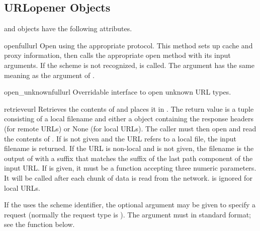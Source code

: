\subsection{URLopener Objects \label{urlopener-objs}}

 and  objects have the
following attributes.

\begin{methoddesc}[URLopener]{open}{fullurl}
Open  using the appropriate protocol.  This method sets
up cache and proxy information, then calls the appropriate open method with
its input arguments.  If the scheme is not recognized,
 is called.  The  argument
has the same meaning as the  argument of .
\end{methoddesc}

\begin{methoddesc}[URLopener]{open_unknown}{fullurl}
Overridable interface to open unknown URL types.
\end{methoddesc}

\begin{methoddesc}[URLopener]{retrieve}{url}
Retrieves the contents of  and places it in .  The
return value is a tuple consisting of a local filename and either a
 object containing the response headers (for remote
URLs) or None (for local URLs).  The caller must then open and read the
contents of .  If  is not given and the URL
refers to a local file, the input filename is returned.  If the URL is
non-local and  is not given, the filename is the output of
 with a suffix that matches the suffix of the last
path component of the input URL.  If  is given, it must be
a function accepting three numeric parameters.  It will be called after each
chunk of data is read from the network.   is ignored for
local URLs.

If the  uses the  scheme identifier, the optional
 argument may be given to specify a  request
(normally the request type is ).  The  argument
must in standard  format;
see the  function below.
\end{methoddesc}

